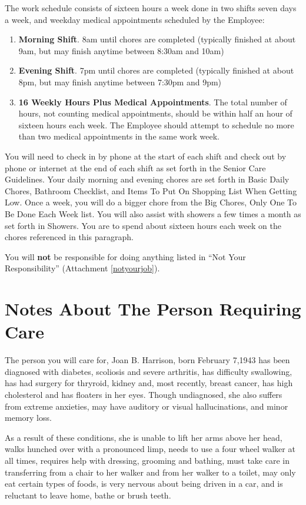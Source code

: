 \documentclass[]{article}
\newcommand{\mom}{Joan B. Harrison}
\newcommand{\rules}{Senior Care Guidelines}
\newcommand{\basic}{Basic Daily Chores}
\newcommand{\bathroom}{Bathroom Checklist}
\newcommand{\shopping}{Items To Put On Shopping List When Getting Low}
\newcommand{\big}{Big Chores, Only One To Be Done Each Week}
\newcommand{\shower}{Showers}
\newcommand{\notyourjob}{Not Your Responsibility}
\begin{document}
The work schedule consists of sixteen hours a week done in two shifts seven days a week, and weekday medical appointments scheduled by the Employee:
\begin{enumerate}
	\item \textbf{Morning Shift}. 8am until chores are completed (typically finished at about 9am, but may finish anytime between 8:30am and 10am)
	\item \textbf{Evening Shift}. 7pm until chores are completed (typically finished at about 8pm, but may finish anytime between 7:30pm and 9pm)
	\item \textbf{16 Weekly Hours Plus Medical Appointments}. The total number of hours, not counting medical appointments, should be within half an hour of sixteen hours each week. The Employee should attempt to schedule no more than two medical appointments in the same work week. 
\end{enumerate}

You will need to check in by phone at the start of each shift and check out by phone or internet at the end of each shift as set forth in the \rules{}. Your daily morning and evening chores are set forth in \basic{}, \bathroom{}, and \shopping{}. Once a week, you will do a bigger chore from the \big{} list. You will also assist with showers a few times a month as set forth in \shower{}. You are to spend about sixteen hours each week on the chores referenced in this paragraph.

You will \textbf{not} be responsible for doing anything listed in ``\notyourjob{}'' (Attachment \ref{notyourjob}). 

\section{Notes About The Person Requiring Care}

The person you will care for, \mom{}, born February 7,1943 has been diagnosed with diabetes, scoliosis and severe arthritis, has difficulty swallowing, has had surgery for thryroid, kidney and, most recently, breast cancer, has high cholesterol and has floaters in her eyes. Though undiagnosed, she also suffers from extreme anxieties, may have auditory or visual hallucinations, and minor memory loss.

As a result of these conditions, she is unable to lift her arms above her head, walks hunched over with a pronounced limp, needs to use a four wheel walker at all times, requires help with dressing, grooming and bathing, must take care in transferring from a chair to her walker and from her walker to a toilet, may only eat certain types of foods, is very nervous about being driven in a car, and is reluctant to leave home, bathe or brush teeth.
\end{document}

